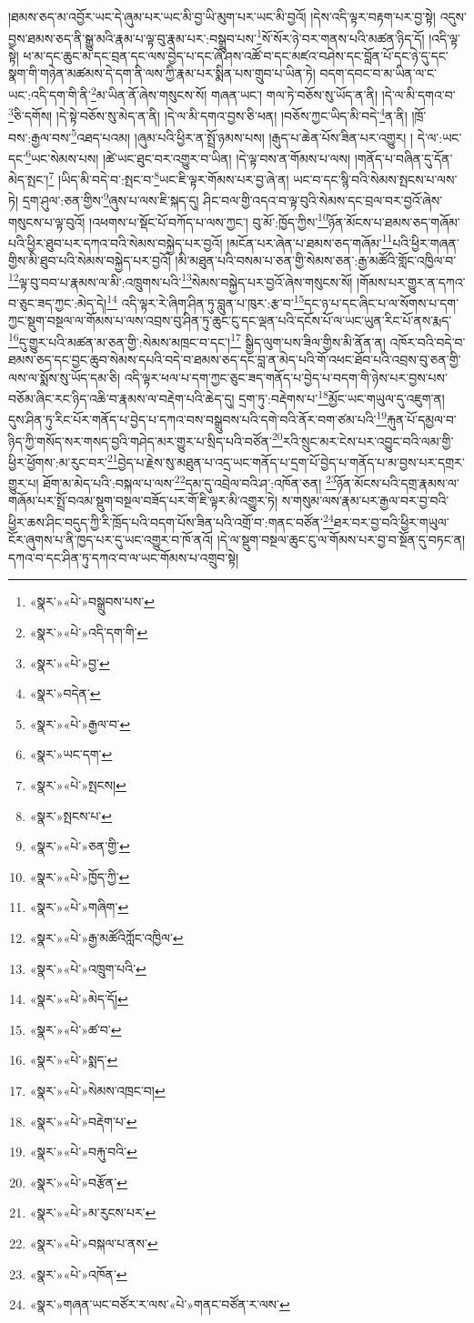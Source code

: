 །ཐམས་ཅད་མ་འབྱོར་ཡང་དེ་ཞུམ་པར་ཡང་མི་བྱ་ཡི་མུག་པར་ཡང་མི་བྱའོ། །དེས་འདི་ལྟར་བརྟག་པར་བྱ་སྟེ། འདུས་བྱས་ཐམས་ཅད་ནི་སྒྱུ་མའི་རྣམ་པ་ལྟ་བུ་རྣམ་པར་:བསྒྲུབ་པས་\footnote{«སྣར་»«པེ་»བསྒྲུབས་པས་}སོ་སོར་ཉེ་བར་གནས་པའི་མཚན་ཉིད་དོ། །འདི་ལྟ་སྟེ། ཕ་མ་དང་ཆུང་མ་དང་བྲན་དང་ལས་བྱེད་པ་དང་ཞོ་ཤས་འཚོ་བ་དང་མཛའ་བཤེས་དང་བློན་པོ་དང་ཉེ་དུ་དང་སྣག་གི་གཉེན་མཚམས་དེ་དག་ནི་ལས་ཀྱི་རྣམ་པར་སྨིན་པས་གྲུབ་པ་ཡིན་ཏེ། བདག་དབང་བ་མ་ཡིན་ལ་ང་ཡང་:འདི་དག་གི་ནི་\footnote{«སྣར་»«པེ་»འདི་དག་གི་}མ་ཡིན་ནོ་ཞེས་གསུངས་སོ། གཞན་ཡང་། གལ་ཏེ་བཅོས་སུ་ཡོད་ན་ནི། །དེ་ལ་མི་དགའ་བ་\footnote{«སྣར་»«པེ་»བྱ་}ཅི་དགོས། །དེ་སྟེ་བཅོས་སུ་མེད་ན་ནི། །དེ་ལ་མི་དགའ་བྱས་ཅི་ཕན། །བཅོས་ཀྱང་ཡིད་མི་བདེ་\footnote{«སྣར་»བདེན་}ན་ནི། །ཁྲོ་བས་:རྒྱལ་བས་\footnote{«སྣར་»«པེ་»རྒྱལ་བ་}འཐད་པའམ། །ཞུམ་པའི་ཕྱིར་ན་སྤྲོ་ཉམས་པས། །རྒུད་པ་ཆེན་པོས་ཟིན་པར་འགྱུར། །
དེ་ལ་:ཡང་དང་\footnote{«སྣར་»ཡང་དག་}ཡང་སེམས་པས། །ཚེ་ཡང་ཐུང་བར་འགྱུར་བ་ཡིན། །དེ་ལྟ་བས་ན་གོམས་པ་ལས། །གནོད་པ་བཞིན་དུ་དོན་མེད་སྤང་།\footnote{«སྣར་»«པེ་»སྤངས།} །ཡིད་མི་བདེ་བ་:སྤང་བ་\footnote{«སྣར་»སྤངས་པ་}ཡང་ཇི་ལྟར་གོམས་པར་བྱ་ཞེ་ན། ཡང་བ་དང་སྙི་བའི་སེམས་སྤངས་པ་ལས་ཏེ། དྲག་ཤུལ་:ཅན་གྱིས་\footnote{«སྣར་»«པེ་»ཅན་གྱི་}ཞུས་པ་ལས་ཇི་སྐད་དུ། ཤིང་བལ་གྱི་འདའ་བ་ལྟ་བུའི་སེམས་དང་བྲལ་བར་བྱའོ་ཞེས་གསུངས་པ་ལྟ་བུའོ། །འཕགས་པ་སྡོང་པོ་བཀོད་པ་ལས་ཀྱང་། བུ་མོ་:ཁྱོད་ཀྱིས་\footnote{«སྣར་»«པེ་»ཁྱོད་ཀྱི་}ཉོན་མོངས་པ་ཐམས་ཅད་གཞོམ་པའི་ཕྱིར་ཐུབ་པར་དཀའ་བའི་སེམས་བསྐྱེད་པར་བྱའོ། །མངོན་པར་ཞེན་པ་ཐམས་ཅད་གཞོམ་\footnote{«སྣར་»«པེ་»གཞིག་}པའི་ཕྱིར་གཞན་གྱིས་མི་ཐུབ་པའི་སེམས་བསྐྱེད་པར་བྱའོ། །མི་མཐུན་པའི་བསམ་པ་ཅན་གྱི་སེམས་ཅན་:རྒྱ་མཚོའི་གློང་འཁྱིལ་བ་\footnote{«སྣར་»«པེ་»རྒྱ་མཚོའིཀློང་འཁྱིལ་}ལྟ་བུ་བབ་པ་རྣམས་ལ་མི་:འཁྲུགས་པའི་\footnote{«སྣར་»«པེ་»འཁྲུག་པའི་}སེམས་བསྐྱེད་པར་བྱའོ་ཞེས་གསུངས་སོ། །གོམས་པར་གྱུར་ན་དཀའ་བ་ཅུང་ཟད་ཀྱང་:མེད་དེ།\footnote{«སྣར་»«པེ་»མེད་དོ།} འདི་ལྟར་རེ་ཞིག་ཤིན་ཏུ་བླུན་པ་ཁུར་:རྩ་བ་\footnote{«སྣར་»«པེ་»ཚ་བ་}དང་ཉ་པ་དང་ཞིང་པ་ལ་སོགས་པ་དག་ཀྱང་སྡུག་བསྔལ་ལ་གོམས་པ་ལས་འབྲས་བུ་ཤིན་ཏུ་ཆུང་ངུ་དང་ལྡན་པའི་དངོས་པོ་ལ་ཡང་ཡུན་རིང་པོ་ནས་རྨད་\footnote{«སྣར་»«པེ་»སྨད་}དུ་གྱུར་པའི་མཚན་མ་ཅན་གྱི་:སེམས་མཁྲང་བ་དང་།\footnote{«སྣར་»«པེ་»སེམས་འཁྲང་བ།} སྒྱིད་ལུག་པས་ཟིལ་གྱིས་མི་ནོན་ན། འཁོར་བའི་བདེ་བ་ཐམས་ཅད་དང་བྱང་ཆུབ་སེམས་དཔའི་བདེ་བ་ཐམས་ཅད་དང་བླ་ན་མེད་པའི་གོ་འཕང་ཐོབ་པའི་འབྲས་བུ་ཅན་གྱི་ལས་ལ་སྨོས་སུ་ཡོད་དམ་ཅི། འདི་ལྟར་ཕལ་པ་དག་ཀྱང་ཅུང་ཟད་གནོད་པ་བྱེད་པ་བདག་གི་ཉེས་པར་བྱས་པས་བཅོམ་ཞིང་རང་ཉིད་འཆི་བ་རྣམས་ལ་བརྡེག་པའི་ཆེད་དུ། དྲག་ཏུ་:བརྡེགས་པ་\footnote{«སྣར་»«པེ་»བརྡེག་པ་}མྱོང་ཡང་གཡུལ་དུ་འཇུག་ན། དུས་ཤིན་ཏུ་རིང་པོར་གནོད་པ་བྱེད་པ་དཀའ་བས་བསྒྲུབས་པའི་དགེ་བའི་ནོར་བག་ཙམ་པའི་\footnote{«སྣར་»«པེ་»བརྐུ་བའི་}རྐུན་པོ་དམྱལ་བ་ཉིད་ཀྱི་གསོད་སར་གསད་བྱའི་གཤེད་མར་གྱུར་པ་སྲིད་པའི་བཙོན་\footnote{«སྣར་»«པེ་»བརྩོན་}རའི་སྲུང་མར་ངེས་པར་འབྱུང་བའི་ལམ་གྱི་ཕྱིར་ཕྱོགས་:མ་རུང་བར་\footnote{«སྣར་»«པེ་»མ་རུངས་པར་}བྱེད་པ་རྗེས་སུ་མཐུན་པ་འདྲ་ཡང་གནོད་པ་དྲག་པོ་བྱེད་པ་གནོད་པ་མ་བྱས་པར་དགྲར་གྱུར་པ། ཐོག་མ་མེད་པའི་:བསྐལ་པ་ལས་\footnote{«སྣར་»«པེ་»བསྐལ་པ་ནས་}དམ་དུ་འབྲེལ་བའི་ཤ་:འཁོན་ཅན། \footnote{«སྣར་»«པེ་»འཁོན་}ཉོན་མོངས་པའི་དགྲ་རྣམས་ལ་གཞོམ་པར་སྤྲོ་བའམ་སྡུག་བསྔལ་བཟོད་པར་གོ་ཇི་ལྟར་མི་འགྱུར་ཏེ། ས་གསུམ་ལས་རྣམ་པར་རྒྱལ་བར་བྱ་བའི་ཕྱིར་ཆས་ཤིང་བདུད་ཀྱི་རི་ཁྲོད་པའི་བདག་པོས་ཟིན་པའི་འགྲོ་བ་:གནང་བཙོན་\footnote{«སྣར་»གཞན་ཡང་བཙོར་ར་ལས་«པེ་»གནང་བཙོན་ར་ལས་}ཐར་བར་བྱ་བའི་ཕྱིར་གཡུལ་ངོར་ཞུགས་པ་ནི་ཁྱད་པར་དུ་ཡང་འགྱུར་བ་ཁོ་ནའོ། །དེ་ལ་སྡུག་བསྔལ་ཆུང་ངུ་ལ་གོམས་པར་བྱ་བ་སྔོན་དུ་བཏང་ན། དཀའ་བ་དང་ཤིན་ཏུ་དཀའ་བ་ལ་ཡང་གོམས་པ་འགྲུབ་སྟེ། 